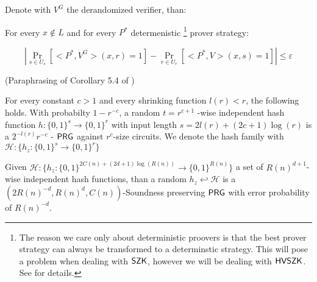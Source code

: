 \documentclass[11]{article}
\begin{document}
Denote with $V^G$ the derandomized verifier, than:

For every $x \notin L$ and for every $P^*$ determenistic \footnote{The reason we care only about deterministic proovers is that the best prover strategy can always be transformed to a determinstic strategy. This will pose a problem when dealing with $\mathsf{SZK}$, however we will be dealing with $\mathsf{HVSZK}$. See \cite{DL20} for details.} prover strategy:
	
$$ |\Pr_{s \in U_s}[<P^*,V^G>(x, r) = 1] - \Pr_{r \in U_r}[<P^*, V>(x, s) = 1]| \leq \varepsilon$$
	

 (Paraphrasing of Corollary 5.4 of \cite{AASY16})

For every constant $c > 1$ and every shrinking function $l(r) < r$, the following holds. With probabilty $1-r^{-c}$, a random $t=r^{c+1}$ -wise independent hash function $h: \{0,1\}^s \to \{0,1\}^r$ with input length $s = 2l(r) + (2c + 1)\log(r)$ is a $2^{-l(r)}r^{-c}$ - $\mathsf{PRG}$ against $r^c$-size circuits. We denote the hash family with $\mathcal{H}: \{h_z: \{0,1\}^s \to \{0,1\}^r\}$

\begin{corollary}
\label{PRG from random hash}

Given $\mathcal{H}: \{h_z:\{0,1\}^{2C(n) + (2d+1)\log(R(n))} \to \{0,1\}^{R(n)}\}$ a set of $R(n)^{d+1}$-wise independent hash functions, than a random $h_z \hookleftarrow \mathcal{H}$ is a $(2R(n)^{-d}, R(n)^{d}, C(n))$-Soundness preserving $\mathsf{PRG}$ with error probability of $R(n)^{-d}$.

\end{corollary}
\end{document}
